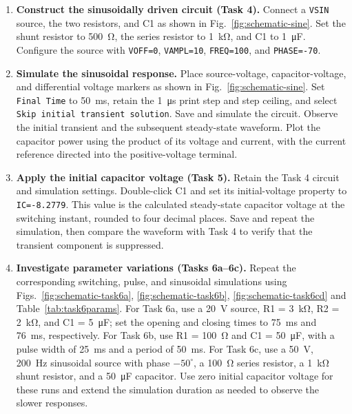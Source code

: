 \documentclass[12pt,a4paper]{article}
\begin{document}
\begin{enumerate}[label=\arabic*., leftmargin=2.5em, itemsep=6pt]
		\item \textbf{Construct the sinusoidally driven circuit (Task 4).}
		Connect a \texttt{VSIN} source, the two resistors, and C1 as
		shown in Fig.~\ref{fig:schematic-sine}.  Set the shunt
		resistor to \SI{500}{\ohm}, the series resistor to
		\SI{1}{\kilo\ohm}, and C1 to \SI{1}{\micro\farad}.
		Configure the source with \texttt{VOFF=0},
		\texttt{VAMPL=10}, \texttt{FREQ=100}, and
		\texttt{PHASE=-70}.
		
		\item \textbf{Simulate the sinusoidal response.}
		Place source-voltage, capacitor-voltage, and differential
		voltage markers as shown in Fig.~\ref{fig:schematic-sine}.
		Set \texttt{Final Time} to \SI{50}{\milli\second}, retain
		the \SI{1}{\micro\second} print step and step ceiling, and
		select \texttt{Skip initial transient solution}.
		Save and simulate the circuit.  Observe the initial transient
		and the subsequent steady-state waveform.  Plot the capacitor
		power using the product of its voltage and current, with the
		current reference directed into the positive-voltage terminal.
		
		\item \textbf{Apply the initial capacitor voltage (Task 5).}
		Retain the Task 4 circuit and simulation settings.
		Double-click C1 and set its initial-voltage property to
		\texttt{IC=-8.2779}.  This value is the calculated
		steady-state capacitor voltage at the switching instant,
		rounded to four decimal places.  Save and repeat the
		simulation, then compare the waveform with Task 4 to verify
		that the transient component is suppressed.
		
		\item \textbf{Investigate parameter variations (Tasks 6a--6c).}
		Repeat the corresponding switching, pulse, and sinusoidal
		simulations using
		Figs.~\ref{fig:schematic-task6a}, \ref{fig:schematic-task6b},
		\ref{fig:schematic-task6cd}
		and Table~\ref{tab:task6params}.  For Task 6a, use a
		\SI{20}{\volt} source, R1 = \SI{3}{\kilo\ohm},
		R2 = \SI{2}{\kilo\ohm}, and C1 = \SI{5}{\micro\farad};
		set the opening and closing times to \SI{75}{\milli\second}
		and \SI{76}{\milli\second}, respectively.
		For Task 6b, use R1 = \SI{100}{\ohm} and
		C1 = \SI{50}{\micro\farad}, with a pulse width of
		\SI{25}{\milli\second} and a period of
		\SI{50}{\milli\second}.  For Task 6c, use a
		\SI{50}{\volt}, \SI{200}{\hertz} sinusoidal source with
		phase $-50^\circ$, a \SI{100}{\ohm} series resistor,
		a \SI{1}{\kilo\ohm} shunt resistor, and a
		\SI{50}{\micro\farad} capacitor.  Use zero initial
		capacitor voltage for these runs and extend the simulation
		duration as needed to observe the slower responses.
		

\end{enumerate}
\end{document}
